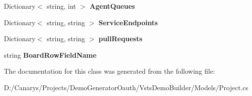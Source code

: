 \begin{DoxyCompactItemize}
\item 
\mbox{\label{class_vsts_demo_builder_1_1_models_1_1_environment_values_a24b3c5061e59d57c9049b86047c6d7af}} 
Dictionary$<$ string, int $>$ {\bfseries Agent\+Queues}
\item 
\mbox{\label{class_vsts_demo_builder_1_1_models_1_1_environment_values_a8d22f62f2440b7839ca33c734f6d8015}} 
Dictionary$<$ string, string $>$ {\bfseries Service\+Endpoints}
\item 
\mbox{\label{class_vsts_demo_builder_1_1_models_1_1_environment_values_afcd78f1075e5452e5b4bea83ee95980c}} 
Dictionary$<$ string, string $>$ {\bfseries pull\+Requests}
\item 
\mbox{\label{class_vsts_demo_builder_1_1_models_1_1_environment_values_ae65872c9d63cdf80c673233af785eb31}} 
string {\bfseries Board\+Row\+Field\+Name}
\end{DoxyCompactItemize}


The documentation for this class was generated from the following file\+:\begin{DoxyCompactItemize}
\item 
D\+:/\+Canarys/\+Projects/\+Demo\+Generator\+Oauth/\+Vsts\+Demo\+Builder/\+Models/Project.\+cs\end{DoxyCompactItemize}
